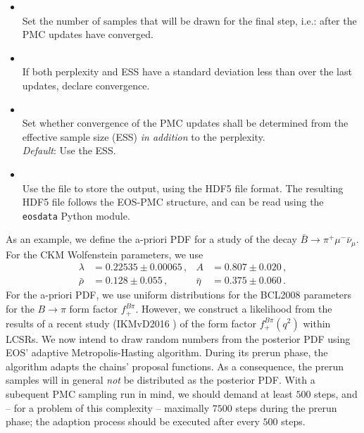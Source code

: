 \begin{itemize}
    \item[] \\[\medskipamount]
        Set the number  of samples that will be drawn for the final step,
        i.e.: after the PMC updates have converged.

    \item[] \\[\medskipamount]
        If both perplexity and ESS have a standard deviation less than  over the
        last  updates, declare convergence.

    \item[] \\[\medskipamount]
        Set whether convergence of the PMC updates shall be determined from the
        effective sample size (ESS) \emph{in addition} to the perplexity.\\
        \emph{Default}: Use the ESS.

    \item[] \\[\medskipamount]
        Use the file  to store the output, using the \gls{HDF5}
        file format.  The resulting \gls{HDF5} file follows the EOS-\gls{PMC}
        structure, and can be read using the \texttt{eosdata} Python
        module.
\end{itemize}

As an example, we define the a-priori \gls{PDF} for a study of the decay $\bar{B}\to \pi^+\mu^-\bar\nu_\mu$.
For the CKM Wolfenstein parameters, we use
\begin{equation*}
\begin{aligned}
    \lambda    & = 0.22535 \pm 0.00065\,,  &
    A          & = 0.807 \pm 0.020\,,      \\
    \bar{\rho} & = 0.128 \pm 0.055\,,      &
    \bar{\eta} & = 0.375 \pm 0.060\,.
\end{aligned}
\end{equation*}
For the a-priori \gls{PDF}, we use uniform distributions for the BCL2008
\cite{Bourrely:2008za} parameters for the $B\to \pi$ form factor $f^{B\pi}_+$.
However, we construct a likelihood from the results of a recent study
(IKMvD2016 \cite{Imsong:2014oqa}) of the form factor $f^{B\pi}_+(q^2)$ within \glspl{LCSR}.
We now intend to draw random numbers from the posterior PDF using EOS' adaptive
Metropolis-Hasting algorithm.  During its prerun phase, the algorithm adapts
the chains' proposal functions. As a consequence, the prerun samples will in
general \emph{not} be distributed as the posterior \gls{PDF}. With a subequent
PMC sampling run in mind, we should demand at least $500$ steps, and -- for a
problem of this complexity -- maximally $7500$ steps during the prerun phase;
the adaption process should be executed after every $500$ steps.\\


